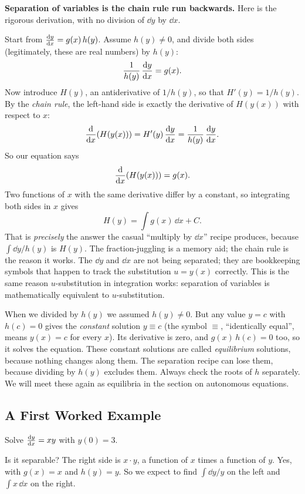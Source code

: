 \begin{whybox}
\textbf{Separation of variables is the chain rule run backwards.} Here is the
rigorous derivation, with no division of $\dd y$ by $\dd x$.

Start from $\frac{\mathrm{d} y}{\mathrm{d} x}=g(x)\,h(y)$. Assume $h(y)\neq 0$, and divide both sides
(legitimately, these are real numbers) by $h(y)$:
\[
  \frac{1}{h(y)}\,\frac{\mathrm{d} y}{\mathrm{d} x} = g(x).
\]
Now introduce $H(y)$, an antiderivative of $1/h(y)$, so that $H'(y)=1/h(y)$. By the
\emph{chain rule}, the left-hand side is exactly the derivative of $H(y(x))$ with
respect to $x$:
\[
  \frac{\mathrm{d}}{\mathrm{d} x}\!\left(H(y(x))\right) = H'(y)\,\frac{\mathrm{d} y}{\mathrm{d} x} = \frac{1}{h(y)}\,\frac{\mathrm{d} y}{\mathrm{d} x}.
\]
So our equation says
\[
  \frac{\mathrm{d}}{\mathrm{d} x}\!\left(H(y(x))\right) = g(x).
\]
Two functions of $x$ with the same derivative differ by a constant, so integrating
both sides in $x$ gives
\[
  H(y) = \int g(x)\,\dd x + C.
\]
That is \emph{precisely} the answer the casual ``multiply by $\dd x$'' recipe
produces, because $\int \dd y / h(y)$ is $H(y)$. The fraction-juggling is a
memory aid; the chain rule is the reason it works. The $\dd y$ and $\dd x$ are not
being separated; they are bookkeeping symbols that happen to track the
substitution $u=y(x)$ correctly. This is the same reason $u$-substitution in
integration works: separation of variables is mathematically equivalent to
$u$-substitution.
\end{whybox}

\begin{trapbox}
When we divided by $h(y)$ we assumed $h(y)\neq 0$. But any value $y=c$ with
$h(c)=0$ gives the \emph{constant} solution $y\equiv c$ (the symbol $\equiv$,
``identically equal'', means $y(x)=c$ for every $x$). Its derivative is zero, and
$g(x)\,h(c)=0$ too, so it solves the equation. These constant solutions are called
\emph{equilibrium} solutions, because nothing changes along them. The separation
recipe can lose them, because dividing by $h(y)$ excludes them. Always check the
roots of $h$ separately. We will meet these again as
equilibria in the section on autonomous equations.
\end{trapbox}

\subsection{A First Worked Example}

Solve $\frac{\mathrm{d} y}{\mathrm{d} x} = xy$ with $y(0)=3$.

\begin{walkbox}
Is it separable? The right side is $x \cdot y$, a function of $x$ times a function
of $y$. Yes, with $g(x)=x$ and $h(y)=y$. So we expect to find $\int \dd y/y$ on the
left and $\int x\,\dd x$ on the right.
\end{walkbox}


